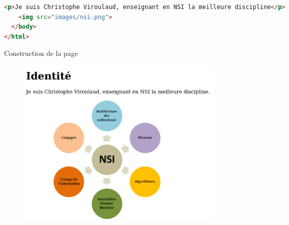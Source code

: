 \documentclass[a4paper,11pt]{article}
\begin{document}
\begin{Form}
\begin{code}[!h]
\begin{lstlisting}[language=html]
    <p>Je suis Christophe Viroulaud, enseignant en NSI la meilleure discipline</p>
    <img src="images/nsi.png">
  </body>
</html>
\end{lstlisting}
\caption{Construction de la page}
\label{site}
\end{code}
\begin{figure}[!h]
\centering
\includegraphics[width=10cm]{ressources/exemple-site.png}
\label{rendu}
\end{figure}
\end{Form}
\end{document}
